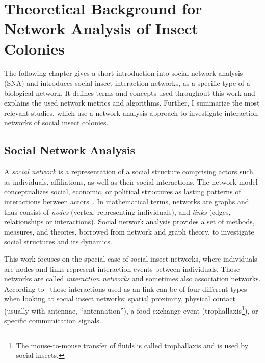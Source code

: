 \chapter{Theoretical Background for Network Analysis of Insect Colonies}
\label{ch:foundation}
The following chapter gives a short introduction into social network analysis (SNA) and introduces social insect interaction networks, as a specific type of a biological network. It defines terms and concepts used throughout this work and explains the used network metrics and algorithms.
Further, I summarize the most relevant studies, which use a network analysis approach to investigate interaction networks of social insect colonies.
\section{Social Network Analysis}
\label{ch:bg}

A \emph{social network} is a representation of a social structure comprising actors such as individuals, affiliations, as well as their social interactions.
The network model conceptualizes social, economic, or political structures as lasting patterns of interactions between actors~\cite{wasserman1994social}.
In mathematical terms, networks are graphs and thus consist of \emph{nodes} (vertex, representing individuals), and \emph{links} (edges, relationships or interactions).
Social network analysis provides a set of methods, measures, and theories, borrowed from network and graph theory, to investigate social structures and its dynamics.

This work focuses on the special case of social insect networks, where individuals are nodes and links represent interaction events between individuals. Those networks are called \emph{interaction networks} and sometimes also association networks.
According to~\textcite{charbonneau2013social} those interactions used as an link can be of four different types when looking at social insect networks: spatial proximity, physical contact (usually with antennae, ``antennation''), a food exchange event (trophallaxis\footnote{The mouse-to-mouse transfer of fluids is called trophallaxis and is used by social insects.}), or specific communication signals.

